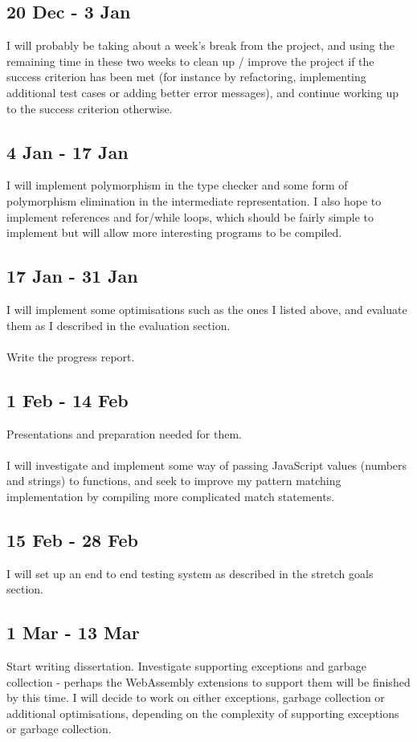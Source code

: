 \documentclass[12pt]{article}
\begin{document}
	\subsection*{20 Dec - 3 Jan}
	I will probably be taking about a week's break from the project, and using the remaining time in these two weeks to clean up / improve the project if the success criterion has been met (for instance by refactoring, implementing additional test cases or adding better error messages), and continue working up to the success criterion otherwise.
	
	\subsection*{4 Jan - 17 Jan}
	I will implement polymorphism in the type checker and some form of polymorphism elimination in the intermediate representation. I also hope to implement references and for/while loops, which should be fairly simple to implement but will allow more interesting programs to be compiled.
	
	\subsection*{17 Jan - 31 Jan}
	I will implement some optimisations such as the ones I listed above, and evaluate them as I described in the evaluation section.
	\\\\
	Write the progress report.
	
	\subsection*{1 Feb - 14 Feb}
	Presentations and preparation needed for them.
	\\\\
	I will investigate and implement some way of passing JavaScript values (numbers and strings) to functions, and seek to improve my pattern matching implementation by compiling more complicated match statements.
	
	\subsection*{15 Feb - 28 Feb}
	I will set up an end to end testing system as described in the stretch goals section.
	
	\subsection*{1 Mar - 13 Mar}
	Start writing dissertation. Investigate supporting exceptions and garbage collection - perhaps the WebAssembly extensions to support them will be finished by this time. I will decide to work on either exceptions, garbage collection or additional optimisations, depending on the complexity of supporting exceptions or garbage collection.
	
\end{document}
